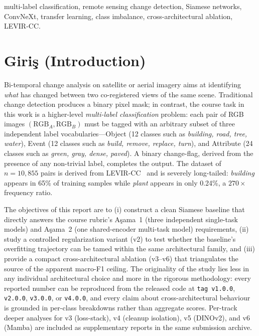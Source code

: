 \documentclass[journal]{IEEEtran}
\begin{document}
\begin{IEEEkeywords}
multi-label classification, remote sensing change detection, Siamese networks, ConvNeXt, transfer learning, class imbalance, cross-architectural ablation, LEVIR-CC.
\end{IEEEkeywords}

\section{Giri\c{s} (Introduction)}\label{sec:giris}
Bi-temporal change analysis on satellite or aerial imagery aims at identifying \emph{what} has changed between two co-registered views of the same scene. Traditional change detection produces a binary pixel mask; in contrast, the course task in this work is a higher-level \emph{multi-label classification} problem: each pair of RGB images $(\mathrm{RGB}_A,\mathrm{RGB}_B)$ must be tagged with an arbitrary subset of three independent label vocabularies---Object (12 classes such as \emph{building, road, tree, water}), Event (12 classes such as \emph{build, remove, replace, turn}), and Attribute (24 classes such as \emph{green, gray, dense, paved}). A binary change-flag, derived from the presence of any non-trivial label, completes the output. The dataset of $n{=}10{,}855$ pairs is derived from LEVIR-CC~\cite{liu2022levircc} and is severely long-tailed: \emph{building} appears in 65\% of training samples while \emph{plant} appears in only 0.24\%, a $270\times$ frequency ratio.

The objectives of this report are to (i) construct a clean Siamese baseline that directly answers the course rubric's A\c{s}ama~1 (three independent single-task models) and A\c{s}ama~2 (one shared-encoder multi-task model) requirements, (ii) study a controlled regularization variant (v2) to test whether the baseline's overfitting trajectory can be tamed within the same architectural family, and (iii) provide a compact cross-architectural ablation (v3--v6) that triangulates the source of the apparent macro-F1 ceiling. The originality of the study lies less in any individual architectural choice and more in the rigorous methodology: every reported number can be reproduced from the released code at \texttt{tag~v1.0.0}, \texttt{v2.0.0}, \texttt{v3.0.0}, or \texttt{v4.0.0}, and every claim about cross-architectural behaviour is grounded in per-class breakdowns rather than aggregate scores. Per-track deeper analyses for v3 (loss-stack), v4 (cleanup isolation), v5 (DINOv2), and v6 (Mamba) are included as supplementary reports in the same submission archive.
\end{document}
